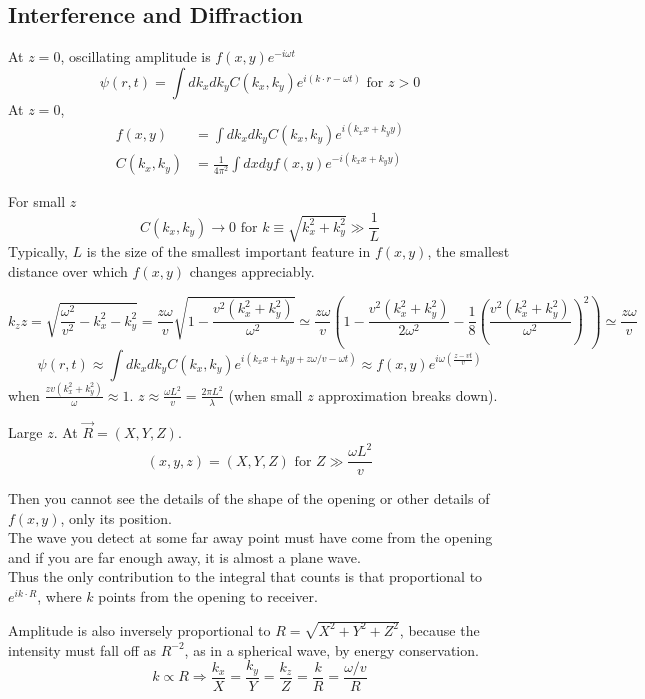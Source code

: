 \documentclass[twoside, 10pt]{amsart}
\begin{document}
\subsection{Interference and Diffraction}

At $z=0$, oscillating amplitude is $f(x,y) e^{-i \omega t}$  
\begin{equation}
  \psi(r,t) = \int dk_x dk_y C(k_x,k_y) e^{ i (k\cdot r - \omega t) } \text{ for } z > 0 
\end{equation}
At $z=0$,
\[
\begin{aligned}
  f(x,y) & = \int dk_x dk_y C(k_x,k_y) e^{ i (k_x x + k_y y ) } \\ 
  C(k_x,k_y) & = \frac{1}{4\pi^2} \int dx dy f(x,y) e^{ -i (k_x x + k_y y) }
\end{aligned}
\]


For small $z$ 
\[
C(k_x,k_y) \to 0 \text{ for } k \equiv \sqrt{ k_x^2 + k_y^2} \gg \frac{1}{L}
\]
Typically, $L$ is the size of the smallest important feature in $f(x,y)$, the smallest distance over which $f(x,y)$ changes appreciably.  

\[
k_z z = \sqrt{ \frac{ \omega^2}{v^2} - k_x^2 - k_y^2 } = \frac{z \omega }{v} \sqrt{  1 - \frac{ v^2 (k_x^2 + k_y^2 ) }{\omega^2 } } \simeq \frac{z\omega}{v} \left( 1 - \frac{ v^2 ( k_x^2  + k_y^2 ) }{ 2 \omega^2 } - \frac{1}{8} \left( \frac{ v^2 ( k_x^2 + k_y^2 ) }{ \omega^2 } \right)^2  \right) \simeq \frac{z\omega }{v} 
\]
\[
\psi(r,t) \approx \int dk_x dk_y C(k_x,k_y) e^{ i (k_x x + k_y y + z\omega/v - \omega t) } \approx f(x,y) e^{ i \omega \left( \frac{ z - vt}{ v} \right) }
\]
when $\frac{ z v (k_x^2 + k_y^2) }{\omega} \approx 1$.  $z \approx \frac{ \omega L^2}{v} = \frac{2 \pi L^2 }{\lambda}$ (when small $z$ approximation breaks down).  

Large $z$.  At $\vec{R} = (X,Y,Z)$.  
\[
(x,y,z) = (X,Y,Z) \text{ for } Z \gg \frac{ \omega L^2 }{v}
\]

Then you cannot see the details of the shape of the opening or other details of $f(x,y)$, only its position.  \\
The wave you detect at some far away point must have come from the opening and if you are far enough away, it is almost a plane wave.  \\
\quad Thus the only contribution to the integral that counts is that proportional to $e^{ik\cdot R}$, where $k$ points from the opening to receiver.  

Amplitude is also inversely proportional to $R = \sqrt{ X^2 + Y^2 + Z^2}$, because the intensity must fall off as $R^{-2}$, as in a spherical wave, by energy conservation.
\[
k \propto R \Longrightarrow \frac{k_x}{X} = \frac{k_y}{Y} = \frac{k_z}{Z} = \frac{k}{R} = \frac{ \omega/v}{ R}
\]
\end{document}
